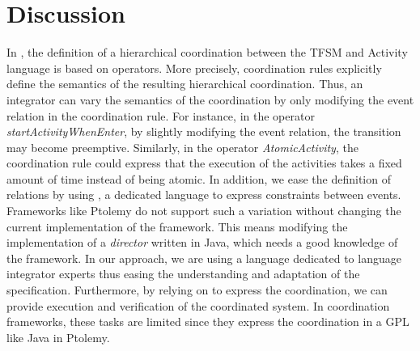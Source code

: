\section{Discussion}
In \bcool, the definition of a hierarchical coordination between the TFSM and Activity language is based on operators. More precisely, coordination rules explicitly define the semantics of the resulting hierarchical coordination. Thus, an integrator can vary the semantics of the coordination by only modifying the event relation in the coordination rule. For instance, in the operator \emph{startActivityWhenEnter}, by slightly modifying the event relation, the transition may become preemptive. Similarly, in the operator \emph{AtomicActivity}, the coordination rule could express that the execution of the activities takes a fixed amount of time instead of being atomic. In addition, we ease the definition of relations by using \moccml, a dedicated language to express constraints between events. Frameworks like Ptolemy do not support such a variation without changing the current implementation of the framework. This means modifying the implementation of a \emph{director} written in Java, which needs a good knowledge of the framework. In our approach, we are using a language dedicated to language integrator experts thus easing the understanding and adaptation of the \bcool specification. Furthermore, by relying on \ccsl to express the coordination, we can provide execution and verification of the coordinated system. In coordination frameworks, these tasks are limited since they express the coordination in a GPL like Java in Ptolemy. 


